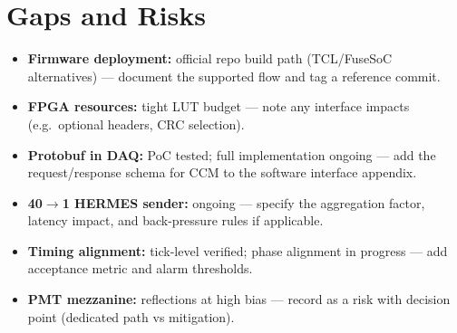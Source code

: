 
\section{Gaps and Risks}
\begin{itemize}
  \item \textbf{Firmware deployment:} official repo build path (TCL/FuseSoC alternatives) --- document the supported flow and tag a reference commit.
  \item \textbf{FPGA resources:} tight LUT budget --- note any interface impacts (e.g.\ optional headers, CRC selection).
  \item \textbf{Protobuf in DAQ:} PoC tested; full implementation ongoing --- add the request/response schema for CCM to the software interface appendix.
  \item \textbf{40$\to$1 HERMES sender:} ongoing --- specify the aggregation factor, latency impact, and back-pressure rules if applicable.
  \item \textbf{Timing alignment:} tick-level verified; phase alignment in progress --- add acceptance metric and alarm thresholds.
  \item \textbf{PMT mezzanine:} reflections at high bias --- record as a risk with decision point (dedicated path vs mitigation).
\end{itemize}
